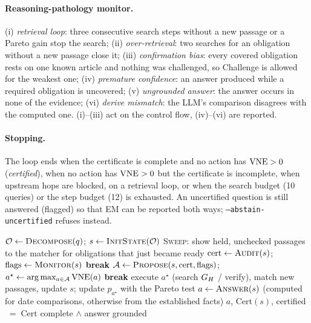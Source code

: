 \paragraph{Reasoning-pathology monitor.} (i) \emph{retrieval loop}: three consecutive search steps without a new passage or a Pareto gain stop the search;
(ii) \emph{over-retrieval}: two searches for an obligation without a new passage close it; (iii) \emph{confirmation bias}: every covered obligation rests on one known
article and nothing was challenged, so Challenge is allowed for the weakest one; (iv) \emph{premature confidence}: an answer produced while a required obligation is uncovered;
(v) \emph{ungrounded answer}: the answer occurs in none of the evidence; (vi) \emph{derive mismatch}: the LLM's comparison disagrees with the computed one.
(i)--(iii) act on the control flow, (iv)--(vi) are reported.

\paragraph{Stopping.} The loop ends when the certificate is complete and no action has $\mathrm{VNE}>0$ (\emph{certified}), when no action has $\mathrm{VNE}>0$ but the
certificate is incomplete, when upstream hops are blocked, on a retrieval loop, or when the search budget (10 queries) or the step budget (12) is exhausted.
An uncertified question is still answered (flagged) so that EM can be reported both ways; \texttt{--abstain-uncertified} refuses instead.

\begin{algorithm}[h]\caption{Evidence-certificate controller for one question}\small
\begin{algorithmic}[1]
\State $\mathcal O\gets\textsc{Decompose}(q)$; $s\gets\textsc{InitState}(\mathcal O)$
 \State \textsc{Sweep}: show held, unchecked passages to the matcher for obligations that just became ready
 \State $\mathrm{cert}\gets\textsc{Audit}(s)$; $\mathrm{flags}\gets\textsc{Monitor}(s)$
  \textbf{break} \EndIf
 \State $\mathcal A\gets\textsc{Propose}(s,\mathrm{cert},\mathrm{flags})$; $a^\star\gets\arg\max_{a\in\mathcal A}\mathrm{VNE}(a)$
  \textbf{break} \EndIf
 \State execute $a^\star$ (search $G_H$ / verify), match new passages, update $s$; update $p_{a^\star}$ with the Pareto test
\EndFor
\State $a\gets\textsc{Answer}(s)$ (computed for date comparisons, otherwise from the established facts)
\State \Return $a$, $\mathrm{Cert}(s)$, certified $\;=\;\mathrm{Cert}$ complete $\wedge$ answer grounded
\end{algorithmic}\end{algorithm}

